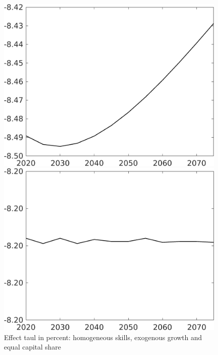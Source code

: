 \begin{figure}[h!!]
	\centering
	\caption{Effect taul in percent: homogeneous skills, exogenous growth and equal capital share }\label{fig:LF_BAU_nsk1_xgr1_equalcapShare}
	\begin{minipage}[]{0.32\textwidth}
		\includegraphics[width=1\textwidth]{../../codding_model/own_basedOnFried/optimalPol_010922_revision/figures/all_13Sept22/CompTaul_Equlab_LFBAUPer_Reg0_Emnet_spillover0_nsk1_xgr1_knspil0_sep1_countec0_GovRev0_etaa0.79.png}
	\end{minipage}	
	\begin{minipage}[]{0.32\textwidth}
		\includegraphics[width=1\textwidth]{../../codding_model/own_basedOnFried/optimalPol_010922_revision/figures/all_13Sept22/CompTaul_Equlab_LFBAUPer_Reg0_hh_spillover0_nsk1_xgr1_knspil0_sep1_countec0_GovRev0_etaa0.79.png}

\end{minipage}
\end{figure}
